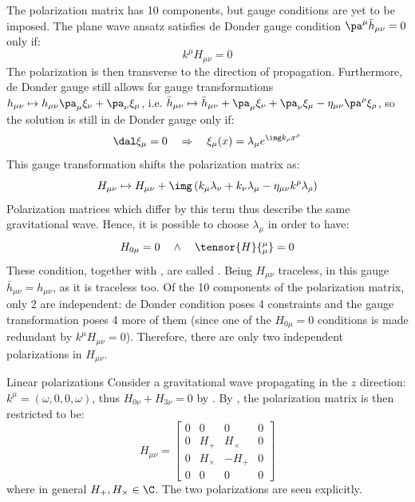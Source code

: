 The polarization matrix has 10 components, but gauge conditions are yet to be imposed. The plane wave ansatz satisfies de Donder gauge condition $ \pa^\mu \bar{h}_{\mu \nu} = 0 $ only if:
\begin{equation}
  k^\mu  H_{\mu \nu} = 0
  \label{eq:transverse}
\end{equation}
The polarization is then transverse to the direction of propagation. Furthermore, de Donder gauge still allows for gauge transformations $ h_{\mu \nu} \mapsto h_{\mu \nu} \pa_\mu \xi_\nu + \pa_\nu \xi_\mu $, i.e. $ \bar{h}_{\mu \nu} \mapsto \bar{h}_{\mu \nu} + \pa_\mu \xi_\nu + \pa_\nu \xi_\mu - \eta_{\mu \nu} \pa^\rho \xi_\rho $, so the solution is still in de Donder gauge only if:
\begin{equation*}
  \dal \xi_\mu = 0 \quad \Rightarrow \quad \xi_\mu(x) = \lambda_\mu e^{\img k_\rho x^\rho}
\end{equation*}
This gauge transformation shifts the polarization matrix as:
\begin{equation}
  H_{\mu \nu} \mapsto H_{\mu \nu} + \img \left( k_\mu \lambda_\nu + k_\nu \lambda_\mu - \eta_{\mu \nu} k^\rho \lambda_\rho \right)
  \label{eq:gw-gauge-tr}
\end{equation}
Polarization matrices which differ by this term thus describe the same gravitational wave. Hence, it is possible to choose $ \lambda_\mu $ in order to have:
\begin{equation}
  H_{0 \mu} = 0 \quad \land \quad \tensor{H}{^\mu_\mu} = 0
  \label{eq:traceless}
\end{equation}
These condition, together with , are called . Being $ H_{\mu \nu} $ traceless, in this gauge $ \bar{h}_{\mu \nu} = h_{\mu \nu} $, as it is traceless too. Of the 10 components of the polarization matrix, only 2 are independent: de Donder condition  poses 4 constraints and the gauge transformation  poses 4 more of them (since one of the $ H_{0\mu} = 0 $ conditions is made redundant by $ k^\mu H_{\mu \nu} = 0 $). Therefore, there are only two independent polarizations in $ H_{\mu \nu} $.

\begin{example}{Linear polarizations}{}
  Consider a gravitational wave propagating in the $ z $ direction: $ k^\mu = (\omega,0,0,\omega) $, thus $ H_{0 \nu} + H_{3 \nu} = 0 $ by . By , the polarization matrix is then restricted to be:
  \begin{equation}
    H_{\mu \nu} =
    \begin{bmatrix}
      0 & 0 & 0 & 0 \\
      0 & H_+ & H_\times & 0 \\
      0 & H_\times & -H_+ & 0 \\
      0 & 0 & 0 & 0
    \end{bmatrix}
    \label{eq:gw-polarizations}
  \end{equation}
  where in general $ H_+, H_\times \in \C $. The two polarizations are seen explicitly.
\end{example}

